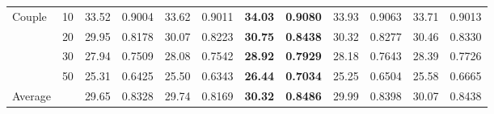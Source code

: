 \begin{table}[p]
{{\begin{tabular}{@{}ll*{5}{cc}@{}}
\addlinespace[0.15ex]
Couple & 10 & 33.52 & 0.9004 & 33.62 & 0.9011 & \textbf{34.03} & \textbf{0.9080} & 33.93 & 0.9063 & 33.71 & 0.9013 \\
 & 20 & 29.95 & 0.8178 & 30.07 & 0.8223 & \textbf{30.75} & \textbf{0.8438} & 30.32 & 0.8277 & 30.46 & 0.8330 \\
 & 30 & 27.94 & 0.7509 & 28.08 & 0.7542 & \textbf{28.92} & \textbf{0.7929} & 28.18 & 0.7643 & 28.39 & 0.7726 \\
 & 50 & 25.31 & 0.6425 & 25.50 & 0.6343 & \textbf{26.44} & \textbf{0.7034} & 25.25 & 0.6504 & 25.58 & 0.6665 \\
\midrule
Average &  & 29.65 & 0.8328 & 29.74 & 0.8169 & \textbf{30.32} & \textbf{0.8486} & 29.99 & 0.8398 & 30.07 & 0.8438 \\
\bottomrule
\end{tabular}%
}
}
\end{table}